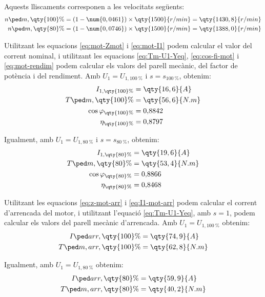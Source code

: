 \begin{exemple}
	Aquests lliscaments corresponen a les velocitats següents:
	\begin{align*}
		n\ped{m,\qty{100}{\%}} &= (1-\num{0,0461})\times \qty{1500}{r/min} = \qty{1430,8}{r/min} \\
		n\ped{m,\qty{80}{\%}} &= (1-\num{0,0746})\times \qty{1500}{r/min} = \qty{1388,0}{r/min}
	\end{align*}
	
	Utilitzant les equacions \eqref{eq:mot-Zmot} i \eqref{eq:mot-I1} podem calcular el valor del corrent nominal, i utilitzant les equacions \eqref{eq:Tm-U1-Yeq}, \eqref{eq:cos-fi-mot} i \eqref{eq:mot-rendim} podem calcular els valors del parell mecànic, del factor de potència i del rendiment. Amb $U_1 = U_{1,\qty{100}{\%}}$  i $s = s_{\qty{100}{\%}}$, obtenim:
	\begin{align*}
		I_{1,\qty{100}{\%}} &= \qty{16,6}{A} \\
		T\ped{m,\qty{100}{\%}} &=  \qty{56,6}{N.m} \\
		\cos\varphi_{\qty{100}{\%}} &=  0{,}8842 \\
		\eta_{\qty{100}{\%}} &=  0{,}8797
	\end{align*}
	
	Igualment, amb $U_1 = U_{1,\qty{80}{\%}}$ i $s = s_{\qty{80}{\%}}$, obtenim:
	\vspace{-2mm}
	\begin{align*}
		I_{1,\qty{80}{\%}} &= \qty{19,6}{A} \\
		T\ped{m,\qty{80}{\%}} &=  \qty{53,4}{N.m} \\
		\cos\varphi_{\qty{80}{\%}} &=  0{,}8866 \\
		\eta_{\qty{80}{\%}} &=  0{,}8468
	\end{align*}

	Utilitzant les equacions \eqref{eq:z-mot-arr} i \eqref{eq:I1-mot-arr} podem calcular el corrent d'arrencada del motor, i utilitzant l'equació \eqref{eq:Tm-U1-Yeq}, amb $s=1$, podem calcular els valors del parell mecànic d'arrencada. Amb $U_1 = U_{1,\qty{100}{\%}}$   obtenim:
	\vspace{-2mm}
	\begin{align*}
		I\ped{arr,\qty{100}{\%}} &=  \qty{74,9}{A} \\
		T\ped{m,arr,\qty{100}{\%}} &=  \qty{62,8}{N.m} 
	\end{align*}
	
	Igualment, amb $U_1 = U_{1,\qty{80}{\%}}$ obtenim:
	\vspace{-2mm}
	\begin{align*}
		I\ped{arr,\qty{80}{\%}} &=  \qty{59,9}{A} \\
		T\ped{m,arr,\qty{80}{\%}} &=  \qty{40,2}{N.m} 
	\end{align*}
	

\end{exemple}
